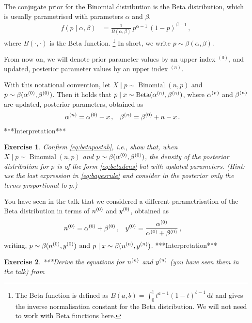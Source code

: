 \documentclass[12pt,a4paper	,twoside]{article}
\newcommand{\dd}{\,\mathrm{d}}
\newcommand{\uz}{^{(0)}} %
\newcommand{\un}{^{(n)}} %
\newcommand{\bin}{\operatorname{Binomial}}
\newcommand{\be}{\operatorname{Beta}}
\newtheorem{myex}{Exercise}
\begin{document}
The conjugate prior for the Binomial distribution is the Beta distribution,
which is usually parametrised with parameters $\alpha$ and $\beta$.
\begin{align}
f(p\mid\alpha,\beta) &= \frac{1}{B(\alpha,\beta)}\, p^{\alpha-1}\, (1-p)^{\beta-1}\,,
\label{eq:betadens}
\end{align}
where $B(\cdot,\cdot)$ is the Beta function.%
\footnote{The Beta function is defined as $B(a,b) = \int_0^1 t^{a-1} (1-t)^{b-1} \dd t$
and gives the inverse normalisation constant for the Beta distribution.
We will not need to work with Beta functions here.}
In short, we write $p \sim \beta(\alpha,\beta)$.

From now on, we will denote prior parameter values by an upper index ${}\uz$,
and updated, posterior parameter values by an upper index ${}\un$.

With this notational convention,
let $X\mid p \sim \bin(n,p)$ and $p \sim \beta(\az,\bz)$.
Then it holds that $p \mid x \sim \be(\an,\bn)$,
where $\an$ and $\bn$ are updated, posterior parameters, obtained as
\begin{align}
\an &= \az + x\,, & \bn &= \bz + n - x \,.
\label{eq:betapostab}
\end{align}
***Interpretation***

\begin{myex}
Confirm \eqref{eq:betapostab}, i.e.,
show that, when $X\mid p \sim \bin(n,p)$ and $p \sim \beta(\az,\bz)$,
the density of the posterior distribution for $p$ is of the form \eqref{eq:betadens}
but with updated parameters.
(Hint: use the last expression in \eqref{eq:bayesrule}
and consider in the posterior only the terms proportional to $p$.)
\end{myex}

You have seen in the talk that we considered a different parametrisation of the Beta distribution
in terms of $\nz$ and $\yz$, obtained as
\begin{align*}
\nz &= \az + \bz\,, & \yz &= \frac{\az}{\az+\bz}\,,
\end{align*}
writing, $p \sim \beta(\nz,\yz)$ and $p\mid x \sim \beta(\nn,\yn)$.
***Interpretation***

\begin{myex}
***Derive the equations for $\nn$ and $\yn$ (you have seen them in the talk) from 
\end{myex}
\end{document}
